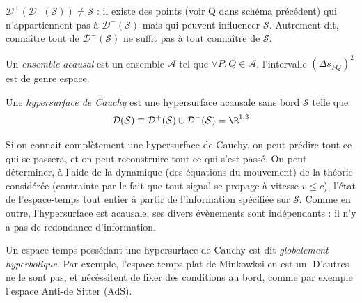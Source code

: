 {\begin{rmk}
    $\mathcal{D}^+(\mathcal{D}^-(\mathcal{S})) \neq \mathcal{S}$ : il existe des points (voir Q dans schéma précédent) qui n'appartiennent pas à $\mathcal{D}^-(\mathcal{S})$ mais qui peuvent influencer $\mathcal{S}$. Autrement dit, connaître tout de $\mathcal{D}^-(\mathcal{S})$ ne suffit pas à tout connaître de $\mathcal{S}$.
\end{rmk}

\begin{theoremframe}
    \begin{defi}
        Un \emph{ensemble acausal} est un ensemble $\mathcal{A}$ tel que $\forall P, Q \in \mathcal{A}$, l'intervalle $(\Delta s_{PQ})^2$ est de genre espace.
    \end{defi}
\end{theoremframe}
\begin{theoremframe}
    \begin{defi}
        Une \emph{hypersurface de Cauchy} est une hypersurface acausale sans bord $\mathcal{S}$ telle que
        \begin{align}
            \mathcal{D}(\mathcal{S}) \equiv \mathcal{D}^+(\mathcal{S}) \cup \mathcal{D}^-(\mathcal{S}) = \R^{1,3}
        \end{align}
    \end{defi}
\end{theoremframe}
Si on connait complètement une hypersurface de Cauchy, on peut prédire tout ce qui se passera, et on peut reconstruire tout ce qui s'est passé. On peut déterminer, à l'aide de la dynamique (des équations du mouvement) de la théorie considérée (contrainte par le fait que tout signal se propage à vitesse $v \leq c$), l'état de l'espace-temps tout entier à partir de l'information spécifiée sur $\mathcal{S}$. Comme en outre, l'hypersurface est acausale, ses divers évènements sont indépendants : il n'y a pas de redondance d'information.

\begin{rmk}
    Un espace-temps possédant une hypersurface de Cauchy est dit \emph{globalement hyperbolique}. Par exemple, l'espace-temps plat de Minkowksi en est un. D'autres ne le sont pas, et nécéssitent de fixer des conditions au bord, comme par exemple l'espace Anti-de Sitter (AdS).
\end{rmk}
}